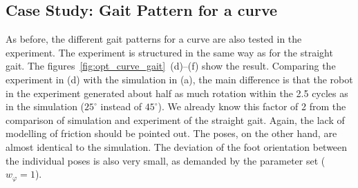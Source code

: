 \documentclass[letterpaper,10pt,conference]{ieeeconf}  %
\begin{document}
\subsection{Case Study: Gait Pattern for a curve}

%
As before, the different gait patterns for a curve are also tested in the experiment.
The experiment is structured in the same way as for the straight gait.
The figures~\ref{fig:opt_curve_gait}~(d)--(f) show the result.
Comparing the experiment in (d) with the simulation in (a), the main difference is that the robot in the  experiment generated about half as much rotation within the 2.5 cycles as in the simulation ($25^\circ$ instead of $45^\circ$).
We already know this factor of 2 from the comparison of simulation and experiment of the straight gait.
Again, the lack of modelling of friction should be pointed out.
The poses, on the other hand, are almost identical to the simulation.
The deviation of the foot orientation between the individual poses is also very small, as demanded by the parameter set ($w_\varphi=1$).
%
%
\end{document}
